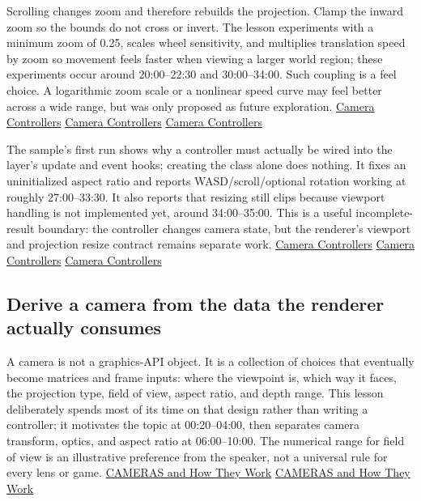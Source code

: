 Scrolling changes zoom and therefore rebuilds the projection. Clamp the inward zoom so the bounds do not cross or invert. The lesson experiments with a minimum zoom of 0.25, scales wheel sensitivity, and multiplies translation speed by zoom so movement feels faster when viewing a larger world region; these experiments occur around 20:00--22:30 and 30:00--34:00. Such coupling is a feel choice. A logarithmic zoom scale or a nonlinear speed curve may feel better across a wide range, but was only proposed as future exploration. \href{https://www.youtube.com/watch?v=q7rwMoZQSmw&t=1200s}{Camera Controllers} \href{https://www.youtube.com/watch?v=q7rwMoZQSmw&t=1800s}{Camera Controllers} \href{https://www.youtube.com/watch?v=q7rwMoZQSmw&t=1980s}{Camera Controllers}

The sample's first run shows why a controller must actually be wired into the layer's update and event hooks; creating the class alone does nothing. It fixes an uninitialized aspect ratio and reports WASD/scroll/optional rotation working at roughly 27:00--33:30. It also reports that resizing still clips because viewport handling is not implemented yet, around 34:00--35:00. This is a useful incomplete-result boundary: the controller changes camera state, but the renderer's viewport and projection resize contract remains separate work. \href{https://www.youtube.com/watch?v=q7rwMoZQSmw&t=1620s}{Camera Controllers} \href{https://www.youtube.com/watch?v=q7rwMoZQSmw&t=1740s}{Camera Controllers} \href{https://www.youtube.com/watch?v=q7rwMoZQSmw&t=2040s}{Camera Controllers}

\subsection{Derive a camera from the data the renderer actually consumes}\label{06-engine-ii-ch026-derive-a-camera-from-the-data-the-renderer-actually-consumes}

A camera is not a graphics-API object. It is a collection of choices that eventually become matrices and frame inputs: where the viewpoint is, which way it faces, the projection type, field of view, aspect ratio, and depth range. This lesson deliberately spends most of its time on that design rather than writing a controller; it motivates the topic at 00:20--04:00, then separates camera transform, optics, and aspect ratio at 06:00--10:00. The numerical range for field of view is an illustrative preference from the speaker, not a universal rule for every lens or game. \href{https://www.youtube.com/watch?v=LfbqtmqxX04&t=20s}{CAMERAS and How They Work} \href{https://www.youtube.com/watch?v=LfbqtmqxX04&t=360s}{CAMERAS and How They Work}

